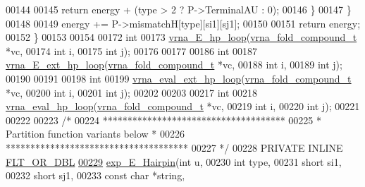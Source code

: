 \begin{DoxyCode}
00144 
00145       \textcolor{keywordflow}{return} energy + (type > 2 ? P->TerminalAU : 0);
00146     \}
00147   \}
00148 
00149   energy += P->mismatchH[type][si1][sj1];
00150 
00151   \textcolor{keywordflow}{return} energy;
00152 \}
00153 
00154 
00172 \textcolor{keywordtype}{int}
00173 \hyperlink{group__loops_ga999ba163a8148d72fd5f22819a681df7}{vrna\_E\_hp\_loop}(\hyperlink{group__fold__compound_structvrna__fc__s}{vrna\_fold\_compound\_t} *vc,
00174                \textcolor{keywordtype}{int}                  i,
00175                \textcolor{keywordtype}{int}                  j);
00176 
00177 
00186 \textcolor{keywordtype}{int}
00187 \hyperlink{group__loops_gac3393ee309372eccae944e3a07f455f9}{vrna\_E\_ext\_hp\_loop}(\hyperlink{group__fold__compound_structvrna__fc__s}{vrna\_fold\_compound\_t} *vc,
00188                    \textcolor{keywordtype}{int}                  i,
00189                    \textcolor{keywordtype}{int}                  j);
00190 
00191 
00198 \textcolor{keywordtype}{int}
00199 \hyperlink{group__loops_gad3b92453a6b501856eec8fae39f3235d}{vrna\_eval\_ext\_hp\_loop}(\hyperlink{group__fold__compound_structvrna__fc__s}{vrna\_fold\_compound\_t}  *vc,
00200                       \textcolor{keywordtype}{int}                   i,
00201                       \textcolor{keywordtype}{int}                   j);
00202 
00203 
00217 \textcolor{keywordtype}{int}
00218 \hyperlink{group__loops_gab3eb4651dc26dc2b653a57dd340d7e68}{vrna\_eval\_hp\_loop}(\hyperlink{group__fold__compound_structvrna__fc__s}{vrna\_fold\_compound\_t}  *vc,
00219                   \textcolor{keywordtype}{int}                   i,
00220                   \textcolor{keywordtype}{int}                   j);
00221 
00222 
00223 \textcolor{comment}{/*}
00224 \textcolor{comment}{ *************************************}
00225 \textcolor{comment}{ * Partition function variants below *}
00226 \textcolor{comment}{ *************************************}
00227 \textcolor{comment}{ */}
00228 PRIVATE INLINE \hyperlink{group__data__structures_ga31125aeace516926bf7f251f759b6126}{FLT\_OR\_DBL}
\hyperlink{group__loops_ga51fb555974f180b78d76142b2894851c}{00229} \hyperlink{group__loops_ga51fb555974f180b78d76142b2894851c}{exp\_E\_Hairpin}(\textcolor{keywordtype}{int}               u,
00230               \textcolor{keywordtype}{int}               type,
00231               \textcolor{keywordtype}{short}             si1,
00232               \textcolor{keywordtype}{short}             sj1,
00233               \textcolor{keyword}{const} \textcolor{keywordtype}{char}        *\textcolor{keywordtype}{string},

\end{DoxyCode}
